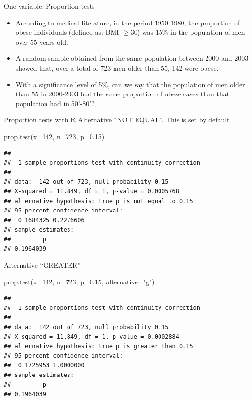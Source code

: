 \documentclass[
  ignorenonframetext,
]{beamer}
\newenvironment{Shaded}{\begin{snugshade}}{\end{snugshade}}
\newcommand{\AttributeTok}[1]{\textcolor[rgb]{0.77,0.63,0.00}{#1}}
\newcommand{\DecValTok}[1]{\textcolor[rgb]{0.00,0.00,0.81}{#1}}
\newcommand{\FloatTok}[1]{\textcolor[rgb]{0.00,0.00,0.81}{#1}}
\newcommand{\FunctionTok}[1]{\textcolor[rgb]{0.00,0.00,0.00}{#1}}
\newcommand{\NormalTok}[1]{#1}
\newcommand{\StringTok}[1]{\textcolor[rgb]{0.31,0.60,0.02}{#1}}
\begin{document}
\begin{frame}{One variable: Proportion tests}
\protect\hypertarget{one-variable-proportion-tests}{}
\begin{itemize}
\item
  According to medical literature, in the period 1950-1980, the
  proportion of obese individuals (defined as: BMI \(\geq 30\)) was 15\%
  in the population of men over 55 years old.
\item
  A random sample obtained from the same population between 2000 and
  2003 showed that, over a total of 723 men older than 55, 142 were
  obese.
\item
  With a significance level of 5\%, can we say that the population of
  men older than 55 in 2000-2003 had the same proportion of obese cases
  than that population had in 50'-80'?
\end{itemize}
\end{frame}

\begin{frame}[fragile]{Proportion tests with R}
\protect\hypertarget{proportion-tests-with-r}{}
Alternative ``NOT EQUAL''. This is set by default.

\begin{Shaded}
\begin{Highlighting}[]
\FunctionTok{prop.test}\NormalTok{(}\AttributeTok{x=}\DecValTok{142}\NormalTok{, }\AttributeTok{n=}\DecValTok{723}\NormalTok{, }\AttributeTok{p=}\FloatTok{0.15}\NormalTok{)}
\end{Highlighting}
\end{Shaded}

\begin{verbatim}
## 
##  1-sample proportions test with continuity correction
## 
## data:  142 out of 723, null probability 0.15
## X-squared = 11.849, df = 1, p-value = 0.0005768
## alternative hypothesis: true p is not equal to 0.15
## 95 percent confidence interval:
##  0.1684325 0.2276606
## sample estimates:
##         p 
## 0.1964039
\end{verbatim}
\end{frame}

\begin{frame}[fragile]
Alternative ``GREATER''

\begin{Shaded}
\begin{Highlighting}[]
\FunctionTok{prop.test}\NormalTok{(}\AttributeTok{x=}\DecValTok{142}\NormalTok{, }\AttributeTok{n=}\DecValTok{723}\NormalTok{, }\AttributeTok{p=}\FloatTok{0.15}\NormalTok{, }\AttributeTok{alternative=}\StringTok{"g"}\NormalTok{)}
\end{Highlighting}
\end{Shaded}

\begin{verbatim}
## 
##  1-sample proportions test with continuity correction
## 
## data:  142 out of 723, null probability 0.15
## X-squared = 11.849, df = 1, p-value = 0.0002884
## alternative hypothesis: true p is greater than 0.15
## 95 percent confidence interval:
##  0.1725953 1.0000000
## sample estimates:
##         p 
## 0.1964039
\end{verbatim}
\end{frame}
\end{document}
